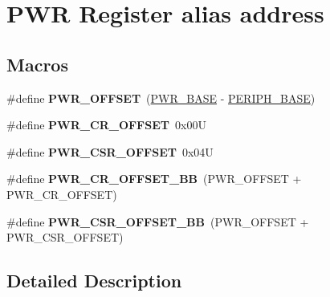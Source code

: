 \hypertarget{group___p_w_r__register__alias__address}{}\section{P\+WR Register alias address}
\label{group___p_w_r__register__alias__address}
\subsection*{Macros}
\begin{DoxyCompactItemize}
\item 
\mbox{\label{group___p_w_r__register__alias__address_ga7f88bce73931300319824f22578f90de}} 
\#define {\bfseries P\+W\+R\+\_\+\+O\+F\+F\+S\+ET}~(\hyperlink{group___peripheral__memory__map_gac691ec23dace8b7a649a25acb110217a}{P\+W\+R\+\_\+\+B\+A\+SE} -\/ \hyperlink{group___peripheral__memory__map_ga9171f49478fa86d932f89e78e73b88b0}{P\+E\+R\+I\+P\+H\+\_\+\+B\+A\+SE})
\item 
\mbox{\label{group___p_w_r__register__alias__address_gafc4a9746ee5df183f01c6c9b2b193bf8}} 
\#define {\bfseries P\+W\+R\+\_\+\+C\+R\+\_\+\+O\+F\+F\+S\+ET}~0x00U
\item 
\mbox{\label{group___p_w_r__register__alias__address_ga5108a7917314663531d70bdf05ea2698}} 
\#define {\bfseries P\+W\+R\+\_\+\+C\+S\+R\+\_\+\+O\+F\+F\+S\+ET}~0x04U
\item 
\mbox{\label{group___p_w_r__register__alias__address_ga387e4e883d6bea5c2223adc42ee72daa}} 
\#define {\bfseries P\+W\+R\+\_\+\+C\+R\+\_\+\+O\+F\+F\+S\+E\+T\+\_\+\+BB}~(P\+W\+R\+\_\+\+O\+F\+F\+S\+ET + P\+W\+R\+\_\+\+C\+R\+\_\+\+O\+F\+F\+S\+ET)
\item 
\mbox{\label{group___p_w_r__register__alias__address_gaa9477acfcacc4610533df164c94ad6fd}} 
\#define {\bfseries P\+W\+R\+\_\+\+C\+S\+R\+\_\+\+O\+F\+F\+S\+E\+T\+\_\+\+BB}~(P\+W\+R\+\_\+\+O\+F\+F\+S\+ET + P\+W\+R\+\_\+\+C\+S\+R\+\_\+\+O\+F\+F\+S\+ET)
\end{DoxyCompactItemize}


\subsection{Detailed Description}
